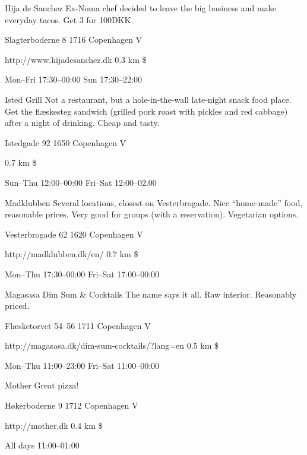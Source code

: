 \begin{fooditem}
{Hija de Sanchez}
{Ex-Noma chef decided to leave the big business and make everyday tacos. Get 3 for 100DKK.}
{\begin{addr}
{Slagterboderne 8}
{1716 Copenhagen V}
\end{addr}}
{http://www.hijadesanchez.dk}
{0.3 km}
{\$}
{\begin{ohours}
{Mon–Fri}
{17:30–00:00}
{Sun}
{17:30–22:00}
{}
{}
{}
{}
\end{ohours}}
\end{fooditem}
\begin{fooditemwourl}
{Isted Grill}
{Not a restaurant, but a hole-in-the-wall late-night snack food place. Get the flæskesteg sandwich (grilled pork roast with pickles and red cabbage) after a night of drinking. Cheap and tasty.}
{\begin{addr}
{Istedgade 92}
{1650 Copenhagen V}
\end{addr}}
{0.7 km}
{\$}
{\begin{ohours}
{Sun–Thu}
{12:00–00:00}
{Fri–Sat}
{12:00–02.00}
{}
{}
{}
{}
\end{ohours}}
\end{fooditemwourl}
\begin{fooditem}
{Madklubben}
{Several locations, closest on Vesterbrogade. Nice “home-made” food, reasonable prices. Very good for groups (with a reservation). Vegetarian options. }
{\begin{addr}
{Vesterbrogade 62}
{1620 Copenhagen V}
\end{addr}}
{http://madklubben.dk/en/ }
{0.7 km}
{\$}
{\begin{ohours}
{Mon–Thu}
{17:30–00:00}
{Fri–Sat}
{17:00–00:00}
{}
{}
{}
{}
\end{ohours}}
\end{fooditem}
\begin{fooditem}
{Magasasa Dim Sum \& Cocktails}
{The name says it all. Raw interior. Reasonably priced. }
{\begin{addr}
{Flæsketorvet 54--56}
{1711 Copenhagen V}
\end{addr}}
{http://magasasa.dk/dim-sum-cocktails/?lang=en}
{0.5 km}
{\$}
{\begin{ohours}
{Mon–Thu}
{11:00–23:00}
{Fri–Sat}
{11:00–00:00}
{}
{}
{}
{}
\end{ohours}}
\end{fooditem}
\begin{fooditem}
{Mother}
{Great pizza!}
{\begin{addr}
{Høkerboderne 9}
{1712 Copenhagen V}
\end{addr}}
{http://mother.dk}
{0.4 km}
{\$}
{\begin{ohours}
{All days}
{11:00–01:00}
{}
{}
{}
{}
{}
{}
\end{ohours}}
\end{fooditem}
